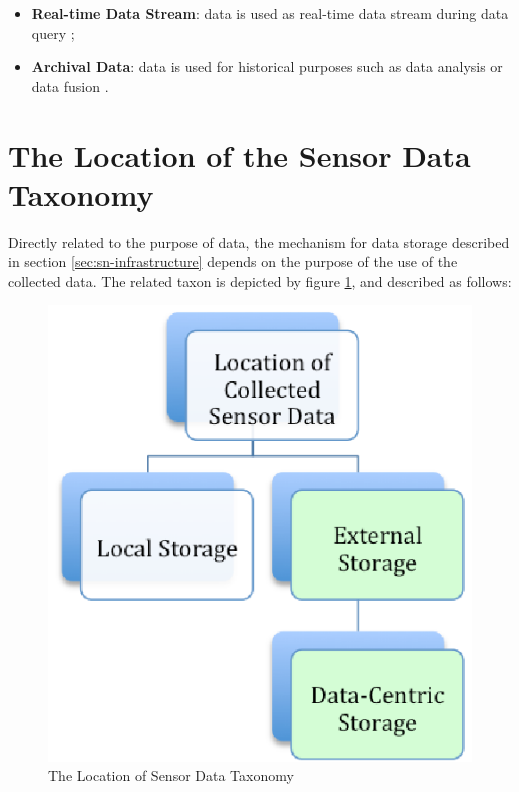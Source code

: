 \begin{itemize}
  \item \textbf{Real-time Data Stream}: data is used as real-time data stream
  during data query \cite{sn-intro01};
  \item \textbf{Archival Data}: data is used for historical purposes such as
  data analysis or data fusion \cite{sn-intro01, sn-intro02}.
\end{itemize}

\section{The Location of the Sensor Data Taxonomy}

Directly related to the purpose of data, the mechanism for data storage
described in section \ref{sec:sn-infrastructure} depends on the purpose of
the use of the collected data. The related taxon is depicted by figure
\ref{fig:taxonomy-data-location}, and described as follows:

\begin{figure}[h]
  \centering
  \includegraphics{../diagrams/taxonomy-data-location}
  \caption{The Location of Sensor Data Taxonomy}
  \label{fig:taxonomy-data-location}
\end{figure}

